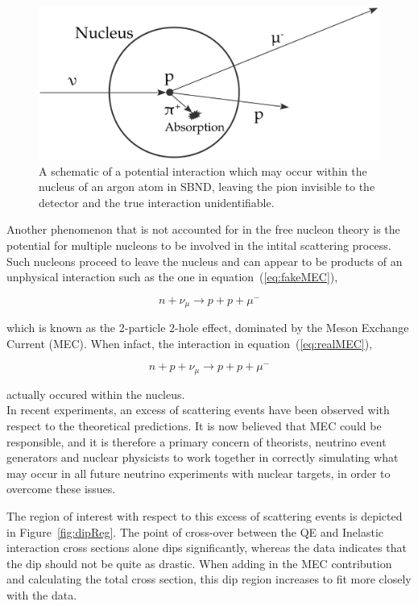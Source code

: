     \begin{figure}[h!]
        \centering
        \includegraphics[width=.6\textwidth]{images/inter_nuc.pdf}
        \caption{A schematic of a potential interaction which may occur within the nucleus of an argon atom in SBND, leaving the pion invisible to the detector and the true interaction unidentifiable.}
        \label{fig:interNuc}
    \end{figure}

Another phenomenon that is not accounted for in the free nucleon theory is the potential for multiple nucleons to be involved in the intital scattering process. Such nucleons proceed to leave the nucleus and can appear to be products of an unphysical interaction such as the one in equation~(\ref{eq:fakeMEC}),

    \begin{equation}\label{eq:fakeMEC}
        n + \nu_{\mu} \longrightarrow p + p + \mu^{-}
    \end{equation}

    which is known as the 2-particle 2-hole effect, dominated by the Meson Exchange Current (MEC). When infact, the interaction in equation~(\ref{eq:realMEC}),
    
    \begin{equation}\label{eq:realMEC}
        n + p + \nu_{\mu} \longrightarrow p + p + \mu^{-}
    \end{equation}

    actually occured within the nucleus. \\

In recent experiments, an excess of scattering events have been observed with respect to the theoretical predictions. It is now believed that MEC could be responsible, and it is therefore a primary concern of theorists, neutrino event generators and nuclear physicists to work together in correctly simulating what may occur in all future neutrino experiments with nuclear targets, in order to overcome these issues.

The region of interest with respect to this excess of scattering events is depicted in Figure~\ref{fig:dipReg}. The point of cross-over between the QE and Inelastic interaction cross sections alone dips significantly, whereas the data indicates that the dip should not be quite as drastic. When adding in the MEC contribution and calculating the total cross section, this dip region increases to fit more closely with the data.  

